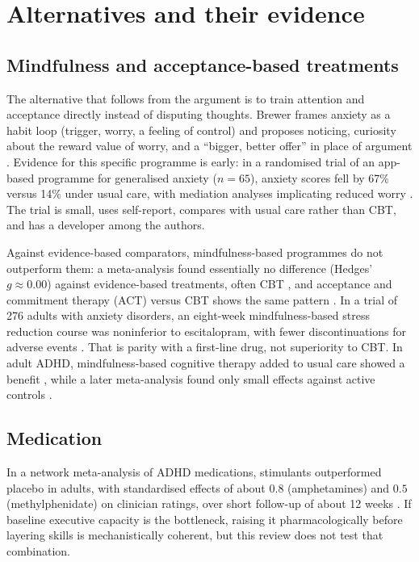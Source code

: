 \section{Alternatives and their evidence}\label{sec:alternatives}
\subsection{Mindfulness and acceptance-based treatments}
The alternative that follows from the argument is to train attention and acceptance directly instead of disputing thoughts. Brewer frames anxiety as a habit loop (trigger, worry, a feeling of control) and proposes noticing, curiosity about the reward value of worry, and a ``bigger, better offer'' in place of argument \citep{brewer2021unwinding}. Evidence for this specific programme is early: in a randomised trial of an app-based programme for generalised anxiety ($n=65$), anxiety scores fell by 67\% versus 14\% under usual care, with mediation analyses implicating reduced worry \citep{roy2021app}. The trial is small, uses self-report, compares with usual care rather than CBT, and has a developer among the authors.

Against evidence-based comparators, mindfulness-based programmes do not outperform them: a meta-analysis found essentially no difference (Hedges' $g\approx 0.00$) against evidence-based treatments, often CBT \citep{goldberg2018mbi}, and acceptance and commitment therapy (ACT) versus CBT shows the same pattern \citep{atjak2015act}. In a trial of 276 adults with anxiety disorders, an eight-week mindfulness-based stress reduction course was noninferior to escitalopram, with fewer discontinuations for adverse events \citep{hoge2023mbsr}. That is parity with a first-line drug, not superiority to CBT. In adult ADHD, mindfulness-based cognitive therapy added to usual care showed a benefit \citep[$d=0.41$;][]{janssen2019mbct}, while a later meta-analysis found only small effects against active controls \citep{oliva2021mbi}.

\subsection{Medication}
In a network meta-analysis of ADHD medications, stimulants outperformed placebo in adults, with standardised effects of about $0.8$ (amphetamines) and $0.5$ (methylphenidate) on clinician ratings, over short follow-up of about 12 weeks \citep{cortese2018adhdmeds}. If baseline executive capacity is the bottleneck, raising it pharmacologically before layering skills is mechanistically coherent, but this review does not test that combination.
